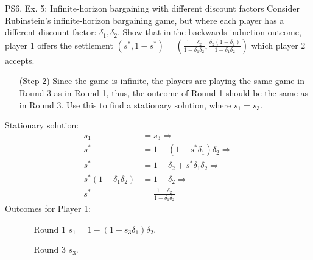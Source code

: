 \begin{frame}{PS6, Ex. 5: Infinite-horizon bargaining with different discount factors}
    Consider Rubinstein's infinite-horizon bargaining game, but where each player has a different discount factor: $\delta_1,\delta_2$. Show that in the backwards induction outcome, player 1 offers the settlement
    $(s^{*},1-s^{*})=\left( \frac{1-\delta_2}{1-\delta_1\delta_2},\frac{\delta_2(1-\delta_1)}{1-\delta_1\delta_2}\right)$
    which player 2 accepts.
    \begin{itemize}
      \item[(Step 2)] Since the game is infinite, the players are playing the same game in Round 3 as in Round 1, thus, the outcome of Round 1 should be the same as in Round 3. Use this to find a stationary solution, where $s_{1}=s_{3}$.
    \end{itemize}
    \vfill\null
  \begin{multicols}{2}
    Stationary solution:
    \begin{align*}
          s_1&= s_3 \Rightarrow\\
        s^{*}&= 1- (1-s^{*}\delta_1)\delta_2 \Rightarrow\\
        s^{*}&= 1-\delta_2+s^{*}\delta_1\delta_2 \Rightarrow\\
        s^{*}(1-\delta_1\delta_2)&= 1-\delta_2 \Rightarrow\\
        s^{*}&= \frac{1-\delta_2}{1-\delta_1\delta_2}
    \end{align*}
    \vfill\null \columnbreak
    Outcomes for Player 1:
    \begin{itemize}
        \item[]\vspace{-8pt}
            \begin{itemize}\normalsize
            \item[Round 1] $s_1 = 1-(1-s_3\delta_1)\delta_2$.
            \item[Round 3] $s_3$.
            \end{itemize}
    \end{itemize}
    \vfill\null
  \end{multicols}
    \vfill\null
\end{frame}
